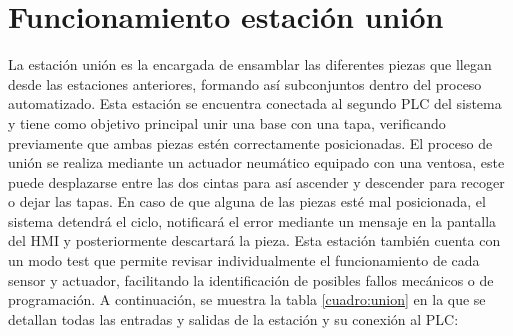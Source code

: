 \section{Funcionamiento estación unión}
\label{sec:funcionamiento_union}

La estación unión es la encargada de ensamblar las diferentes piezas que llegan desde las estaciones anteriores, formando así subconjuntos dentro del proceso automatizado. Esta estación se encuentra conectada al segundo PLC del sistema y tiene como objetivo principal unir una base con una tapa, verificando previamente que ambas piezas estén correctamente posicionadas. El proceso de unión se realiza mediante un actuador neumático equipado con una ventosa, este puede desplazarse entre las dos cintas para así ascender y descender para recoger o dejar las tapas. En caso de que alguna de las piezas esté mal posicionada, el sistema detendrá el ciclo, notificará el error mediante un mensaje en la pantalla del HMI y posteriormente descartará la pieza. Esta estación también cuenta con un modo test que permite revisar individualmente el funcionamiento de cada sensor y actuador, facilitando la identificación de posibles fallos mecánicos o de programación. A continuación, se muestra la tabla \ref{cuadro:union} en la que se detallan todas las entradas y salidas de la estación y su conexión al PLC:

